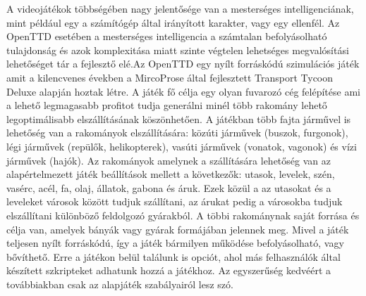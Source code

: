 

A videojátékok többségében nagy jelentősége van a mesterséges intelligenciának, mint például egy a számítógép által irányított karakter, vagy egy ellenfél. Az OpenTTD esetében a mesterséges intelligencia a számtalan befolyásolható tulajdonság és azok komplexitása miatt szinte végtelen lehetséges megvalósítási lehetőséget tár a fejlesztő elé.Az OpenTTD egy nyílt forráskódú szimulációs játék amit a kilencvenes években a MircoProse által fejlesztett Transport Tycoon Deluxe alapján hoztak létre.
A játék fő célja egy olyan fuvarozó cég felépítése ami a lehető legmagasabb profitot tudja generálni minél több rakomány lehető legoptimálisabb elszállításának köszönhetően. A játékban több fajta járművel is lehetőség van a rakományok elszállítására: közúti járművek (buszok, furgonok), légi járművek (repülők, helikopterek), vasúti járművek (vonatok, vagonok) és vízi járművek (hajók). Az rakományok amelynek a szállítására lehetőség van az alapértelmezett játék beállítások mellett a következők: utasok, levelek, szén, vasérc, acél, fa, olaj, állatok, gabona és áruk. Ezek közül a az utasokat és a leveleket városok között tudjuk szállítani, az árukat pedig a városokba tudjuk elszállítani különböző feldolgozó gyárakból. A többi rakománynak saját forrása és célja van, amelyek bányák vagy gyárak formájában jelennek meg. Mivel a játék teljesen nyílt forráskódú, így a játék bármilyen működése befolyásolható, vagy bővíthető. Erre a játékon belül találunk is opciót, ahol más felhasználók által készített szkripteket adhatunk hozzá a játékhoz. Az egyszerűség kedvéért a továbbiakban csak az alapjáték szabályairól lesz szó.

